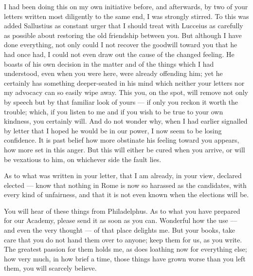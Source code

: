 

 I had been doing this on my own initiative before, and afterwards, by two of your letters written most diligently to the same end, I was strongly stirred. To this was added Sallustius as constant urger that I should treat with Lucceius as carefully as possible about restoring the old friendship between you. But although I have done everything, not only could I not recover the goodwill toward you that he had once had, I could not even draw out the cause of the changed feeling. He boasts of his own decision in the matter and of the things which I had understood, even when you were here, were already offending him; yet he certainly has something deeper-seated in his mind which neither your letters nor my advocacy can so easily wipe away. This you, on the spot, will remove not only by speech but by that familiar look of yours --- if only you reckon it worth the trouble; which, if you listen to me and if you wish to be true to your own kindness, you certainly will. And do not wonder why, when I had earlier signalled by letter that I hoped he would be in our power, I now seem to be losing confidence. It is past belief how more obstinate his feeling toward you appears, how more set in this anger. But this will either be cured when you arrive, or will be vexatious to him, on whichever side the fault lies.

 As to what was written in your letter, that I am already, in your view, declared elected --- know that nothing in Rome is now so harassed as the candidates, with every kind of unfairness, and that it is not even known when the elections will be.

 You will hear of these things from Philadelphus. As to what you have prepared for our Academy, please send it as soon as you can. Wonderful how the use --- and even the very thought --- of that place delights me. But your books, take care that you do not hand them over to anyone; keep them for us, as you write. The greatest passion for them holds me, as does loathing now for everything else; how very much, in how brief a time, those things have grown worse than you left them, you will scarcely believe.
